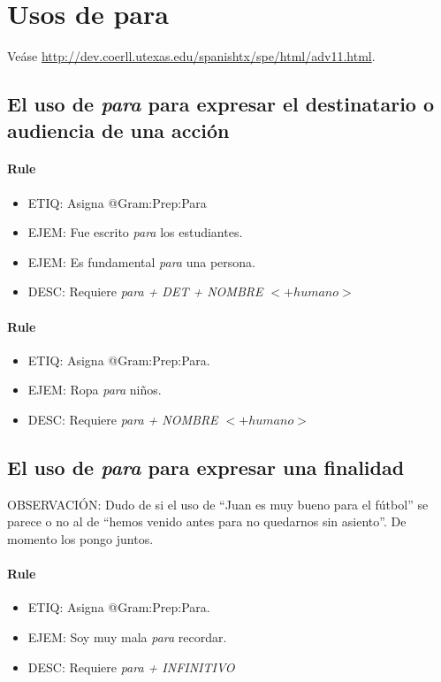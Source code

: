\documentclass[11pt]{report}
\begin{document}
\section{Usos de para}
Veáse \url{http://dev.coerll.utexas.edu/spanishtx/spe/html/adv11.html}.

\subsection{El uso de \emph{para} para expresar el destinatario o audiencia de una acción}
\paragraph*{Rule}
\begin{itemize}
\item ETIQ: Asigna @Gram:Prep:Para
\item EJEM: Fue escrito \emph{para} los estudiantes.
\item EJEM: Es fundamental \emph{para} una persona.
\item DESC: Requiere \emph{para + DET + NOMBRE $<+humano>$}
\end{itemize}

\paragraph*{Rule}
\begin{itemize}
\item ETIQ: Asigna @Gram:Prep:Para.
\item EJEM: Ropa \emph{para} niños.
\item DESC: Requiere \emph{para + NOMBRE $<+humano>$}
\end{itemize}

\subsection{El uso de \emph{para} para expresar una finalidad}
OBSERVACIÓN: Dudo de si el uso de ``Juan es muy bueno para el fútbol'' se parece o no al de ``hemos venido antes para no quedarnos sin asiento''. De momento los pongo juntos.

\paragraph*{Rule}
\begin{itemize}
\item ETIQ: Asigna @Gram:Prep:Para.
\item EJEM: Soy muy mala \emph{para} recordar.
\item DESC: Requiere \emph{para + INFINITIVO}
\end{itemize}
\end{document}
